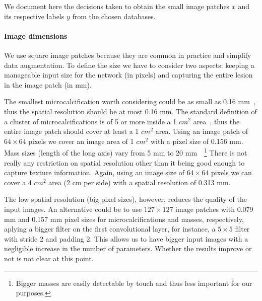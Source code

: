 We document here the decisions taken to obtain the small image patches $x$ and its respective labels $y$ from the chosen databases.

\paragraph{Image dimensions}
We use square image patches because they are common in practice and simplify data augmentation. To define the size we have to consider two aspects: keeping a manageable input size for the network (in pixels) and capturing the entire lesion in the image patch (in mm).

The smallest microcalcification worth considering could be as small as 0.16 mm~\cite{Lo1998}, thus the spatial resolution should be at most 0.16 mm. The standard definition of a cluster of microcalcifications is of 5 or more inside a 1 $cm^2$ area~\cite{Sickles2013}, thus the entire image patch should cover at least a 1 $cm^2$ area. Using an image patch of $64  \times 64$ pixels we cover an image area of 1 $cm^2$ with a pixel size of 0.156 mm. 
Mass sizes (length of the long axis) vary from 5 mm to 20 mm~\cite{Sahiner1996}~\footnote{Bigger masses are easily detectable by touch and thus less important for our purposes.} There is not really any restriction on spatial resolution other than it being good enough to capture texture information. Again, using an image size of $64 \times 64$ pixels we can cover a 4 $cm^2$ area (2 cm per side) with a spatial resolution of 0.313 mm.

The low spatial resolution (big pixel sizes), however, reduces the quality of the input images. An alternative could be to use $127 \times 127$ image patches with 0.079 mm and 0.157 mm pixel sizes for microcalcifications and masses, respectively, aplying a bigger filter on the first convolutional layer, for instance, a $5 \times 5$ filter with stride 2 and padding 2. This allows us to have bigger input images with a negligible increase in the number of parameters. Whether the results improve or not is not clear at this point.

